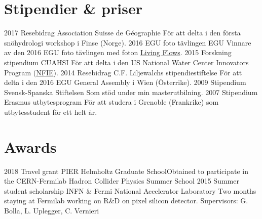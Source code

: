 \ifswedish
  \section{Stipendier \& priser}
    \position
      {2017}
      {Resebidrag}
      {Association Suisse de Géographie}
      {För att delta i den första snöhydrologi workshop i Finse (Norge).}
    \position
      {2016}
      {EGU foto tävlingen}
      {EGU}
      {Vinnare av den 2016 EGU foto tävlingen med foton \href{https://blogs.egu.eu/geolog/2016/08/29/imaggeo-on-mondays-living-flows/}{Living Flows}.}
    \position
      {2015}
      {Forskning stipendium}
      {CUAHSI}
      {För att delta i den US National Water Center Innovators Program  (\href{https://www.cuahsi.org/education/summerinstitute/}{NFIE}).}
    \position
      {2014}
      {Resebidrag}
      {C.F. Liljewalchs stipendiestiftelse}
      {För att delta i den 2016 EGU General Assembly i Wien (Österrike).}
    \position
      {2009}
      {Stipendium}
      {Svensk-Spanska Stiftelsen}
      {Som stöd under min masterutbilning.}
    \position
      {2007}
      {Stipendium}
      {Erasmus utbytesprogram}
      {För att studera i Grenoble (Frankrike) som utbytesstudent för ett helt år.}
\else
  \section{Awards}
    \ifacademic
      \position
        {2018}
        {Travel grant}
        {PIER Helmholtz Graduate School}{Obtained to participate in the CERN-Fermilab Hadron Collider Physics Summer School}
      \position
        {2015}
        {Summer student scholarship}
        {INFN \& Fermi National Accelerator Laboratory} 
        {Two months staying at Fermilab working on R\&D on pixel silicon detector. \newline Supervisors: G. Bolla, L. Uplegger, C. Vernieri}
    \fi
\fi
